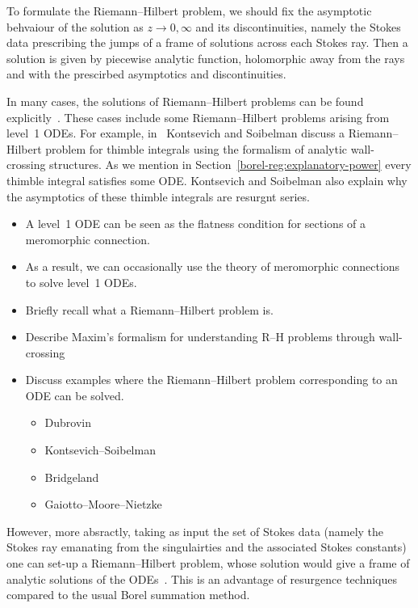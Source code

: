 \documentclass{article}
\theoremstyle{definition}
\theoremstyle{plain}
\newenvironment{brainstorm}{\color{BlueViolet}\begin{itemize}}{\end{itemize}\color{black}}
\newenvironment{old}{\color{RoyalBlue}}{\color{black}}
\newenvironment{draft}{\color{SlateBlue}}{\color{black}}
\begin{document}
To formulate the Riemann--Hilbert problem, we should fix the asymptotic behvaiour of the solution as $z\to0,\infty$ and its discontinuities, namely the Stokes data prescribing the jumps of a frame of solutions across each Stokes ray. Then a solution is given by piecewise analytic function, holomorphic away from the rays and with the prescirbed asymptotics and discontinuities. 

In many cases, the solutions of Riemann--Hilbert problems can be found explicitly~\cite{Dubrovin-tt_star,Dubrovin-Heun,GMN1,Tom-RH-1,Tom-RH-conifold,BBS-RH}. \begin{draft}These cases include some Riemann--Hilbert problems arising from level~1 ODEs.\end{draft} For example, in~\cite[Section~6.2.1]{kontsevich2022analyticity} Kontsevich and Soibelman discuss a Riemann--Hilbert problem for thimble integrals using the formalism of analytic wall-crossing structures. As we mention in Section~\ref{borel-reg:explanatory-power} every thimble integral satisfies some ODE. Kontsevich and Soibelman also explain why the asymptotics of these thimble integrals are resurgnt series.

\begin{brainstorm}
\item A level~1 ODE can be seen as the flatness condition for sections of a meromorphic connection.
\item As a result, we can occasionally use the theory of meromorphic connections to solve level~1 ODEs.
\item Briefly recall what a Riemann--Hilbert problem is.
\item Describe Maxim's formalism for understanding R--H problems through wall-crossing
\item Discuss examples where the Riemann--Hilbert problem corresponding to an ODE can be solved.
\begin{itemize}
\item Dubrovin
\item Kontsevich--Soibelman
\item Bridgeland
\item Gaiotto--Moore--Nietzke
\end{itemize}
\end{brainstorm}
\begin{old}\par
However, more absractly, taking as input the set of Stokes data (namely the Stokes ray emanating from the singulairties and the associated Stokes constants) one can set-up a Riemann--Hilbert problem, whose solution would give a frame of analytic solutions of the ODEs~\cite{kontsevich2022analyticity}. This is an advantage of resurgence techniques compared to the usual Borel summation method. 
\end{old}
%
\end{document}
